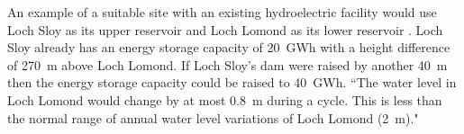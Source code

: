 An example of a suitable site with an existing hydroelectric facility would use Loch Sloy as its upper reservoir and Loch Lomond as its lower reservoir \citep{MacKayDavid2009, Strathclyde2004}.
Loch Sloy already has an energy storage capacity of 20~GWh with a height difference of 270~m above Loch Lomond.
If Loch Sloy's dam were raised by another 40~m then the energy storage capacity could be raised to 40~GWh.
``The water level in Loch Lomond would change by at most 0.8~m during a cycle.
This is less than the normal range of annual water level variations of Loch Lomond (2~m)." \citep[p.~193]{MacKayDavid2009}

\begin{comment}
\textbf{Loch Sloy}

``Loch Sloy was built to provide power for the Glasgow area to meet peak electricity demand.

``[\ldots]
As previous stated Loch Sloy Hydro Scheme was built in 1948 as a peak demand station for the Glasgow area. \hl{Being close to a major city and the grid it was decided to investigate the potential for conversion to Pumped Storage. The reason being that the top reservoir Loch Sloy exists, therefore no civil engineering costs would be incurred in new dam construction. Pumped storage requires that the turbine/pumps are below the minimum water level in the lower reservoir, in this case Loch Lomond. A new power station and tunnels would require to be excavated inside Ben Vorlich.} Research in the North of Scotland Hydro-Electric annual reports uncovered the original design criteria shown below.

``Output initially 120Mw

Output now 190Mw

Annual output 130Gw hours

Top dam storage capacity 15.5\% of gross annual output.

Annual output x percentage storage capacity/365 = daily storage capacity

``Answer 20.4 GWh pumped storage capacity"
\url{http://www.esru.strath.ac.uk/EandE/Web_sites/03-04/wind/content/storage%20available.html}

	``It is also to submit to Scottish Ministers an application for consent to develop a 60MW pumped storage scheme at its existing Sloy hydro electric power station at Loch Lomond, \hl{allowing it to produce an additional 100GWh (gigawatt hours) of electricity in a typical year to help meet peak demand}."
	\url{http://scotsrenewables.com/blog/distributionandstorage/pumped-storage-hydro-in-scotland/}


\end{comment}

